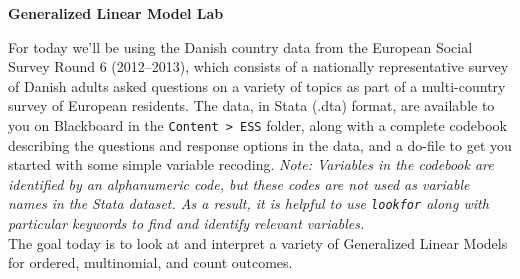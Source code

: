 \documentclass[a4paper,12pt]{article}
\begin{document}
\begin{center}
\textbf{Generalized Linear Model Lab}
\end{center}

For today we'll be using the Danish country data from the European Social Survey Round 6 (2012--2013), which consists of a nationally representative survey of Danish adults asked questions on a variety of topics as part of a multi-country survey of European residents. The data, in Stata (.dta) format, are available to you on Blackboard in the \texttt{Content > ESS} folder, along with a complete codebook describing the questions and response options in the data, and a do-file to get you started with some simple variable recoding.%
{\em Note: Variables in the codebook are identified by an alphanumeric code, but these codes are not used as variable names in the Stata dataset. As a result, it is helpful to use \texttt{lookfor} along with particular keywords to find and identify relevant variables.}\\

\noindent The goal today is to look at and interpret a variety of Generalized Linear Models for ordered, multinomial, and count outcomes.
\end{document}
